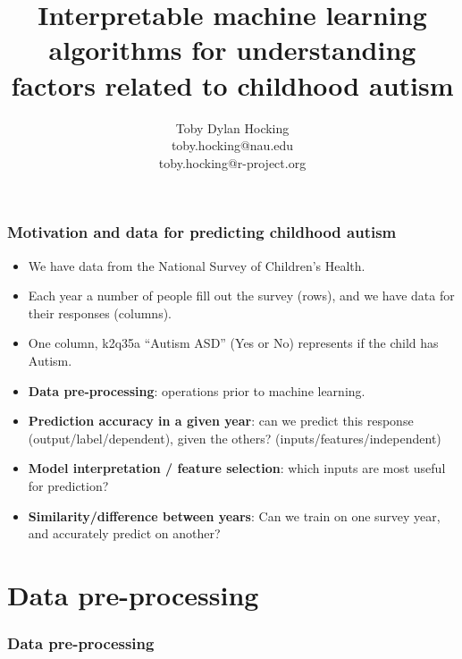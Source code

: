 \documentclass{beamer}
\begin{document}
\title{Interpretable machine learning algorithms for understanding factors related to childhood autism}

\author{
  Toby Dylan Hocking\\
  toby.hocking@nau.edu\\
  toby.hocking@r-project.org\\
}

\maketitle

\begin{frame}
  \frametitle{Motivation and data for predicting childhood autism}
  \begin{itemize}
  \item We have data from the National Survey of Children's Health.
  \item Each year a number of people fill out the survey (rows), and
    we have data for their responses (columns).
  \item One column, k2q35a ``Autism ASD'' (Yes or No) represents if
    the child has Autism.
  \item \textbf{Data pre-processing}: operations prior to machine
    learning.
  \item \textbf{Prediction accuracy in a given year}: can we predict
    this response (output/label/dependent), given the others?
    (inputs/features/independent)
  \item \textbf{Model interpretation / feature selection}: which
    inputs are most useful for prediction?
  \item \textbf{Similarity/difference between years}: Can we train
    on one survey year, and accurately predict on another?
  \end{itemize}
\end{frame}

\section{Data pre-processing}

\begin{frame}
  \frametitle{Data pre-processing}

  \scriptsize
  
   
\end{frame} 
\end{document}
